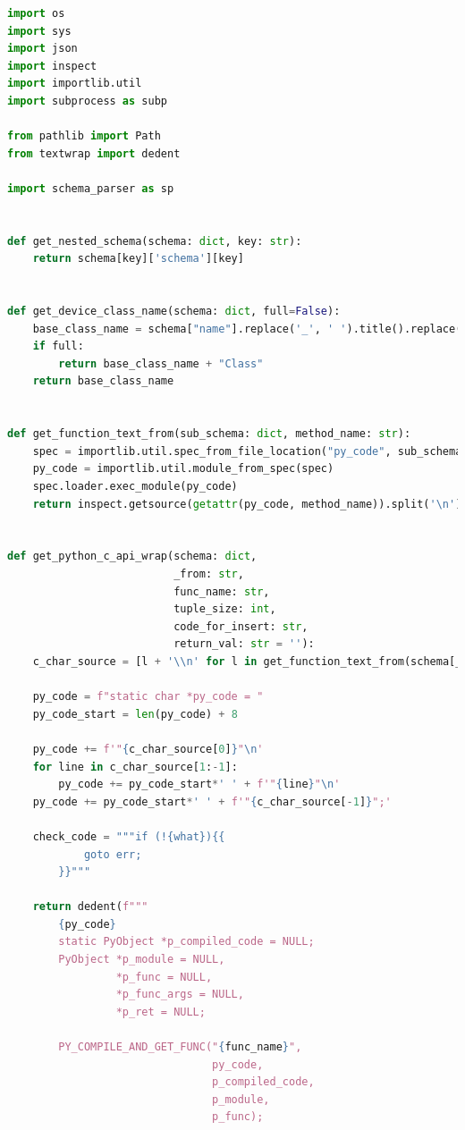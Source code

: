 \begin{lstlisting}[language={Python},basicstyle=\tiny,stepnumber=1,caption={Вспомогательные методы кодогенерации},label={lst:main.py}]
import os
import sys
import json
import inspect
import importlib.util
import subprocess as subp

from pathlib import Path
from textwrap import dedent

import schema_parser as sp


def get_nested_schema(schema: dict, key: str):
    return schema[key]['schema'][key]


def get_device_class_name(schema: dict, full=False):
    base_class_name = schema["name"].replace('_', ' ').title().replace(' ', '')
    if full:
        return base_class_name + "Class"
    return base_class_name


def get_function_text_from(sub_schema: dict, method_name: str):
    spec = importlib.util.spec_from_file_location("py_code", sub_schema["code"])
    py_code = importlib.util.module_from_spec(spec)
    spec.loader.exec_module(py_code)
    return inspect.getsource(getattr(py_code, method_name)).split('\n')


def get_python_c_api_wrap(schema: dict,
                          _from: str,
                          func_name: str,
                          tuple_size: int,
                          code_for_insert: str,
                          return_val: str = ''):
    c_char_source = [l + '\\n' for l in get_function_text_from(schema[_from], func_name)]

    py_code = f"static char *py_code = "
    py_code_start = len(py_code) + 8

    py_code += f'"{c_char_source[0]}"\n'
    for line in c_char_source[1:-1]:
        py_code += py_code_start*' ' + f'"{line}"\n'
    py_code += py_code_start*' ' + f'"{c_char_source[-1]}";'

    check_code = """if (!{what}){{
            goto err;
        }}"""

    return dedent(f"""
        {py_code}
        static PyObject *p_compiled_code = NULL;
        PyObject *p_module = NULL,
                 *p_func = NULL,
                 *p_func_args = NULL,
                 *p_ret = NULL;

        PY_COMPILE_AND_GET_FUNC("{func_name}",
                                py_code,
                                p_compiled_code,
                                p_module,
                                p_func);


\end{lstlisting}
